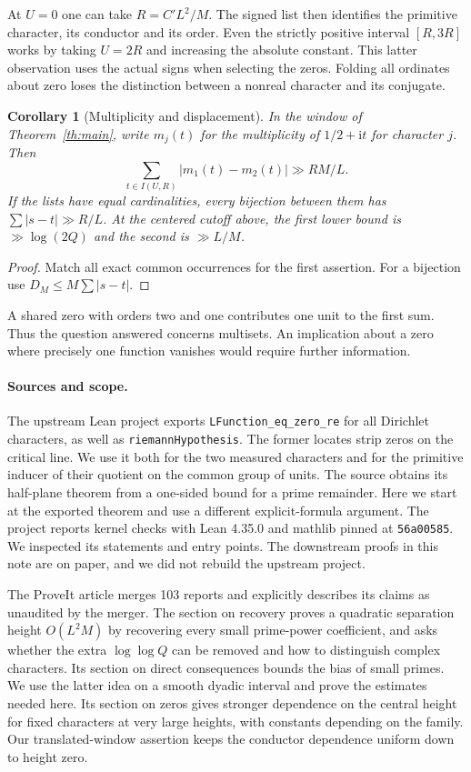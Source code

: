 \documentclass[11pt]{article}
\newtheorem{corollary}[theorem]{Corollary}
\newcommand{\ii}{\mathrm i}
\begin{document}
At $U=0$ one can take $R=C' L^2/M$. The signed list then identifies the primitive character, its conductor and its order. Even the strictly positive interval $[R,3R]$ works by taking $U=2R$ and increasing the absolute constant. This latter observation uses the actual signs when selecting the zeros. Folding all ordinates about zero loses the distinction between a nonreal character and its conjugate.

\begin{corollary}[Multiplicity and displacement]\label{cor:mass}
In the window of Theorem~\ref{th:main}, write $m_j(t)$ for the multiplicity of $1/2+\ii t$ for character $j$. Then
\[
 \sum_{t\in I(U,R)} |m_1(t)-m_2(t)|\gg R M/L.
\]
If the lists have equal cardinalities, every bijection between them has $\sum|s-t|\gg R/L$. At the centered cutoff above, the first lower bound is $\gg\log(2Q)$ and the second is $\gg L/M$.
\end{corollary}
\begin{proof}
Match all exact common occurrences for the first assertion. For a bijection use $D_M\le M\sum|s-t|$.
\end{proof}
A shared zero with orders two and one contributes one unit to the first sum. Thus the question answered concerns multisets. An implication about a zero where precisely one function vanishes would require further information.

\paragraph{Sources and scope.}
The upstream Lean project \cite{lean} exports \texttt{LFunction\_eq\_zero\_re} for all Dirichlet characters, as well as \texttt{riemannHypothesis}. The former locates strip zeros on the critical line. We use it both for the two measured characters and for the primitive inducer of their quotient on the common group of units. The source obtains its half-plane theorem from a one-sided bound for a prime remainder. Here we start at the exported theorem and use a different explicit-formula argument. The project reports kernel checks with Lean 4.35.0 and mathlib pinned at \texttt{56a00585}. We inspected its statements and entry points. The downstream proofs in this note are on paper, and we did not rebuild the upstream project.

The ProveIt article \cite{proveit} merges 103 reports and explicitly describes its claims as unaudited by the merger. The section on recovery proves a quadratic separation height $O(L^2 M)$ by recovering every small prime-power coefficient, and asks whether the extra $\log\log Q$ can be removed and how to distinguish complex characters. Its section on direct consequences bounds the bias of small primes. We use the latter idea on a smooth dyadic interval and prove the estimates needed here. Its section on zeros gives stronger dependence on the central height for fixed characters at very large heights, with constants depending on the family. Our translated-window assertion keeps the conductor dependence uniform down to height zero.
\end{document}
